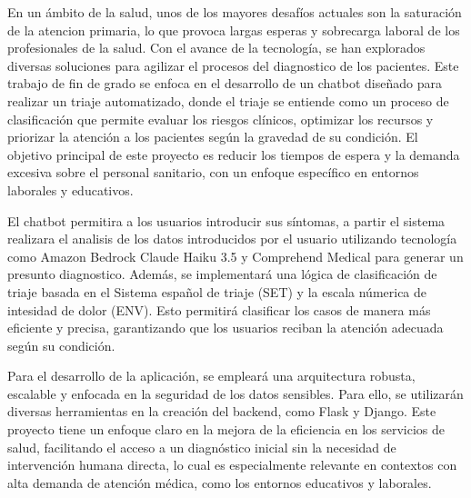 
En un ámbito de la salud, unos de los mayores desafíos actuales son la saturación de la atencion primaria, lo que provoca largas esperas y sobrecarga laboral de los profesionales de la salud. Con el avance de la tecnología, se han explorados diversas soluciones para agilizar el procesos del diagnostico de los pacientes. Este trabajo de fin de grado se enfoca en el desarrollo de un chatbot diseñado para realizar un triaje automatizado, donde el triaje se entiende como un proceso de clasificación que permite evaluar los riesgos clínicos, optimizar los recursos y priorizar la atención a los pacientes según la gravedad de su condición. El objetivo principal de este proyecto es reducir los tiempos de espera y la demanda excesiva sobre el personal sanitario, con un enfoque específico en entornos laborales y educativos.

El chatbot permitira a los usuarios introducir sus síntomas, a partir el sistema realizara el analisis de los datos introducidos por el usuario utilizando tecnología como Amazon Bedrock Claude Haiku 3.5 y Comprehend Medical para generar un presunto diagnostico. Además, se implementará una lógica de clasificación de triaje basada en el Sistema español de triaje (SET) y la escala númerica de intesidad de dolor (ENV). Esto permitirá clasificar los casos de manera más eficiente y precisa, garantizando que los usuarios reciban la atención adecuada según su condición.

Para el desarrollo de la aplicación, se empleará una arquitectura robusta, escalable y enfocada en la seguridad de los datos sensibles. Para ello, se utilizarán diversas herramientas en la creación del backend, como Flask y Django. Este proyecto tiene un enfoque claro en la mejora de la eficiencia en los servicios de salud, facilitando el acceso a un diagnóstico inicial sin la necesidad de intervención humana directa, lo cual es especialmente relevante en contextos con alta demanda de atención médica, como los entornos educativos y laborales.